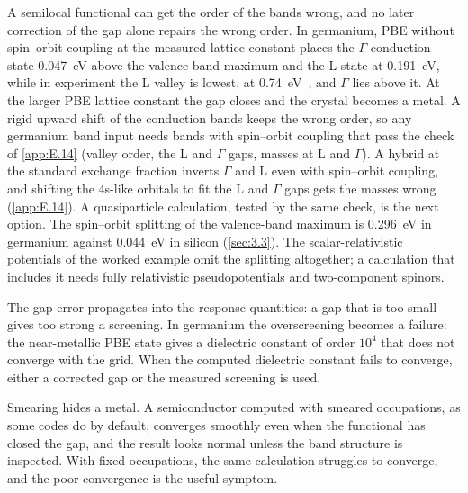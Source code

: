 A semilocal functional can get the order of the bands wrong, and no later correction of the gap alone repairs the wrong order. In germanium, PBE without spin--orbit coupling at the measured lattice constant places the $\Gamma$ conduction state \SI{0.047}{eV} above the valence-band maximum and the L state at \SI{0.191}{eV}, while in experiment the L valley is lowest, at \SI{0.74}{eV}~\cite[Table~I]{lucero2012improved}, and $\Gamma$ lies above it. At the larger PBE lattice constant the gap closes and the crystal becomes a metal. A rigid upward shift of the conduction bands keeps the wrong order, so any germanium band input needs bands with spin--orbit coupling that pass the check of \cref{app:E.14} (valley order, the L and $\Gamma$ gaps, masses at L and $\Gamma$). A hybrid at the standard exchange fraction inverts $\Gamma$ and L even with spin--orbit coupling, and shifting the 4s-like orbitals to fit the L and $\Gamma$ gaps gets the masses wrong (\cref{app:E.14}). A quasiparticle calculation, tested by the same check, is the next option. The spin--orbit splitting of the valence-band maximum is \SI{0.296}{eV} in germanium against \SI{0.044}{eV} in silicon (\cref{sec:3.3}). The scalar-relativistic potentials of the worked example omit the splitting altogether; a calculation that includes it needs fully relativistic pseudopotentials and two-component spinors.

The gap error propagates into the response quantities: a gap that is too small gives too strong a screening. In germanium the overscreening becomes a failure: the near-metallic PBE state gives a dielectric constant of order $10^4$ that does not converge with the grid. When the computed dielectric constant fails to converge, either a corrected gap or the measured screening is used.

Smearing hides a metal. A semiconductor computed with smeared occupations, as some codes do by default, converges smoothly even when the functional has closed the gap, and the result looks normal unless the band structure is inspected. With fixed occupations, the same calculation struggles to converge, and the poor convergence is the useful symptom.
